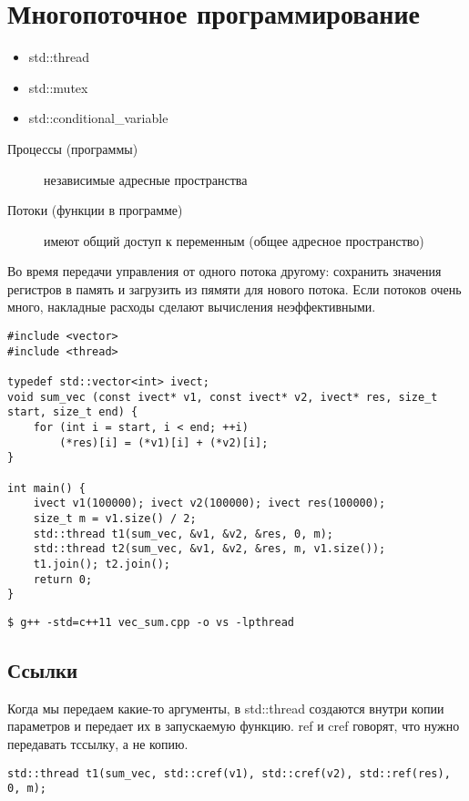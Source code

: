 \section{Многопоточное программирование}
\begin{itemize}[noitemsep]
	\item std::thread
	\item std::mutex
	\item std::conditional\_variable
\end{itemize}
\begin{description}
	\item[Процессы (программы)] независимые адресные пространства
	\item[Потоки (функции в программе)]
		имеют общий доступ к переменным (общее адресное пространство)
\end{description}
Во время передачи управления от одного потока другому: сохранить значения регистров в память и загрузить из пямяти для нового потока. Если потоков очень много, накладные расходы сделают вычисления неэффективными.

\begin{verbatim}
#include <vector>
#include <thread>

typedef std::vector<int> ivect;
void sum_vec (const ivect* v1, const ivect* v2, ivect* res, size_t start, size_t end) {
	for (int i = start, i < end; ++i)
		(*res)[i] = (*v1)[i] + (*v2)[i];
}

int main() {
	ivect v1(100000); ivect v2(100000); ivect res(100000);
	size_t m = v1.size() / 2;
	std::thread t1(sum_vec, &v1, &v2, &res, 0, m);
	std::thread t2(sum_vec, &v1, &v2, &res, m, v1.size());
	t1.join(); t2.join(); 
	return 0;
}
\end{verbatim}
\begin{verbatim}
$ g++ -std=c++11 vec_sum.cpp -o vs -lpthread
\end{verbatim}

\subsection{Ссылки}
Когда мы передаем какие-то аргументы, в std::thread создаются внутри копии параметров и передает их в запускаемую функцию. ref и cref говорят, что нужно передавать тссылку, а не копию.
\begin{verbatim}
std::thread t1(sum_vec, std::cref(v1), std::cref(v2), std::ref(res), 0, m);
\end{verbatim}
